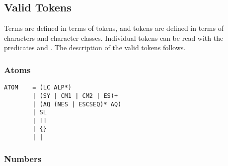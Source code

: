 \subsection{Valid Tokens}
\label{tokendef}

Terms are defined in terms of tokens, and tokens are defined in terms of
characters and character classes.
Individual tokens can be read with the predicates
 and
.
The description of the valid tokens follows.

\vfill %

\subsubsection{Atoms}

\begin{verbatim}
ATOM    = (LC ALP*)
        | (SY | CM1 | CM2 | ES)+
        | (AQ (NES | ESCSEQ)* AQ)
        | SL
        | []
        | {}
        | |
\end{verbatim}

\subsubsection{Numbers}

